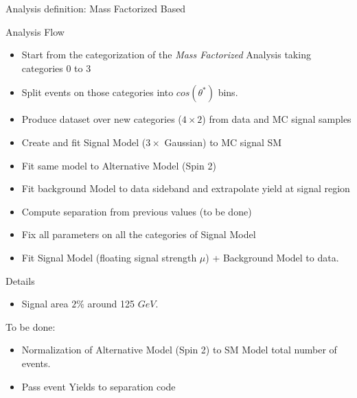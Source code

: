 \documentclass[8pt]{beamer}
\begin{document}
\begin{frame}{Analysis definition: Mass Factorized Based}

  \begin{block}{Analysis Flow}
 
    \begin{itemize}
      \item Start from the categorization of the \textit{Mass Factorized} Analysis taking categories 0 to 3 
      \item Split events on those categories into $cos(\theta^*)$ bins.
      \item Produce dataset over new categories ($4 \times 2$) from data and MC signal samples
      \item Create and fit Signal Model ($3 \times$ Gaussian) to MC signal SM 
      \item Fit same model to Alternative Model (Spin 2)
      \item Fit background Model to data sideband and extrapolate yield at signal region
      \item Compute separation from previous values (to be done)
      \item Fix all parameters on all the categories of Signal Model
      \item Fit Signal Model (floating signal strength $\mu$) + Background Model to data.
    \end{itemize}
 
  \end{block}

    \begin{block}{Details}
 
    \begin{itemize}
      \item Signal area $2\%$ around 125 $GeV$.
    \end{itemize}
 
    \end{block}

    \begin{block}{To be done:}
 
    \begin{itemize}
      \item Normalization of Alternative Model (Spin 2) to SM Model total number of events.
      \item Pass event Yields to separation code 
    \end{itemize}
 
    \end{block}

\end{frame}
\end{document}
